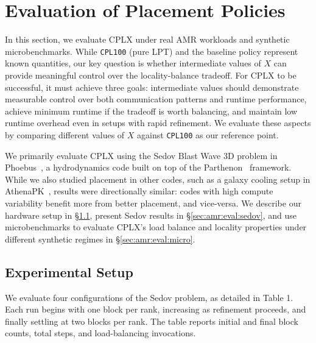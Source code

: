 \section{Evaluation of Placement Policies}\label{sec:amr:eval}

\newcommand{\baseline}{\texttt{Baseline}} \newcommand{\cpla}{\texttt{CPL0}}
\newcommand{\cplb}{\texttt{CPL25}} \newcommand{\cplc}{\texttt{CPL50}}
\newcommand{\cpld}{\texttt{CPL75}} \newcommand{\cple}{\texttt{CPL100}}

\tableruns

In this section, we evaluate CPLX under real AMR workloads and synthetic microbenchmarks.
While {\cple} (pure LPT) and the baseline policy represent known quantities, our key question is
whether intermediate values of $X$ can provide meaningful control over the locality-balance
tradeoff.
For CPLX to be successful, it must achieve three goals: intermediate values should demonstrate
measurable control over both communication patterns and runtime performance, achieve minimum
runtime if the tradeoff is worth balancing, and maintain low runtime overhead even in setups with
rapid refinement.
We evaluate these aspects by comparing different values of $X$ against {\cple} as our reference
point.

We primarily evaluate CPLX using the Sedov Blast Wave 3D problem in
Phoebus~\cite{Barke2024:Phoebus}, a hydrodynamics code built on top of the
Parthenon~\cite{Grete2023:Parthenon} framework.
While we also studied placement in other codes, such as a galaxy cooling setup in
AthenaPK~\cite{Grete2023:Parthenon}, results were directionally similar: codes with high compute
variability benefit more from better placement, and vice-versa.
We describe our hardware setup in \S\ref{sec:amr:eval:setup}, present Sedov results in
\S\ref{sec:amr:eval:sedov}, and use microbenchmarks to evaluate CPLX's load balance and locality
properties under different synthetic regimes in \S\ref{sec:amr:eval:micro}.


\subsection{Experimental Setup}\label{sec:amr:eval:setup}

We evaluate four configurations of the Sedov problem, as detailed in Table 1.
Each run begins with one block per rank, increasing as refinement proceeds, and finally settling at
\mytilde{}two blocks per rank.
The table reports initial and final block counts, total steps, and load-balancing invocations.

